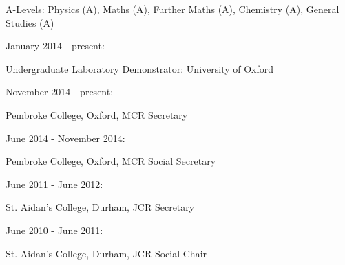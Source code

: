 \documentclass{article}
\begin{document}
\hangindent=30pt \indent \indent A-Levels: Physics (A), Maths (A), Further Maths (A), Chemistry (A), General Studies (A)

\noindent\makebox[\linewidth]{\rule{0.8\paperwidth}{0.2pt}}


\indent January 2014 - present:

\indent \indent Undergraduate Laboratory Demonstrator: University of Oxford

\noindent\makebox[\linewidth]{\rule{0.8\paperwidth}{0.2pt}}



\indent November 2014 - present:

\indent \indent Pembroke College, Oxford, MCR Secretary

\smallskip

\indent June 2014 - November 2014:

\indent \indent Pembroke College, Oxford, MCR Social Secretary

\smallskip

\indent June 2011 - June 2012:

\indent \indent St. Aidan's College, Durham, JCR Secretary
\smallskip

\indent June 2010 - June 2011:

\indent \indent St. Aidan's College, Durham, JCR Social Chair

\noindent\makebox[\linewidth]{\rule{0.8\paperwidth}{0.2pt}}
\end{document}
